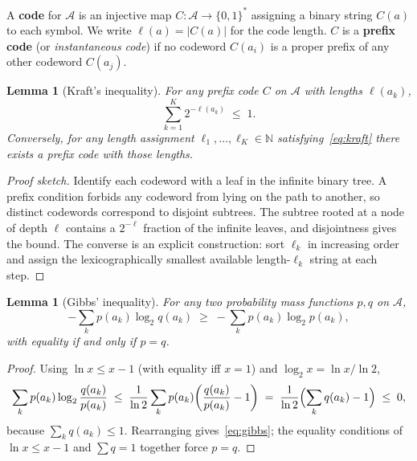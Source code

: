 \documentclass[12pt,a4paper]{article}
\theoremstyle{plain}
\newtheorem{lemma}[theorem]{Lemma}
\theoremstyle{definition}
\begin{document}
A \textbf{code} for $\mathcal{A}$ is an injective map
$C : \mathcal{A} \to \{0,1\}^*$ assigning a binary string $C(a)$ to
each symbol.  We write $\ell(a) = |C(a)|$ for the code length.  $C$ is
a \textbf{prefix code} (or \emph{instantaneous code}) if no codeword
$C(a_i)$ is a proper prefix of any other codeword $C(a_j)$.

\begin{lemma}[Kraft's inequality]
\label{lem:kraft}
For any prefix code $C$ on $\mathcal{A}$ with lengths $\ell(a_k)$,
\begin{equation}
  \sum_{k=1}^{K} 2^{-\ell(a_k)} \;\le\; 1.
  \label{eq:kraft}
\end{equation}
Conversely, for any length assignment $\ell_1, \dots, \ell_K \in
\mathbb{N}$ satisfying~\eqref{eq:kraft} there exists a prefix code
with those lengths.
\end{lemma}

\begin{proof}[Proof sketch]
Identify each codeword with a leaf in the infinite binary tree.  A
prefix condition forbids any codeword from lying on the path to
another, so distinct codewords correspond to disjoint subtrees.  The
subtree rooted at a node of depth $\ell$ contains a $2^{-\ell}$
fraction of the infinite leaves, and disjointness gives the bound.
The converse is an explicit construction: sort $\ell_k$ in increasing
order and assign the lexicographically smallest available
length-$\ell_k$ string at each step.
\end{proof}

\begin{lemma}[Gibbs' inequality]
\label{lem:gibbs}
For any two probability mass functions $p, q$ on $\mathcal{A}$,
\begin{equation}
  -\sum_{k} p(a_k) \log_2 q(a_k)
    \;\ge\; -\sum_{k} p(a_k) \log_2 p(a_k),
  \label{eq:gibbs}
\end{equation}
with equality if and only if $p = q$.
\end{lemma}

\begin{proof}
Using $\ln x \le x - 1$ (with equality iff $x = 1$) and
$\log_2 x = \ln x / \ln 2$,
\[
  \sum_k p(a_k) \log_2 \frac{q(a_k)}{p(a_k)}
  \;\le\; \frac{1}{\ln 2}\sum_k p(a_k)\!\left(\frac{q(a_k)}{p(a_k)} - 1\right)
  \;=\; \frac{1}{\ln 2}\Bigl(\sum_k q(a_k) - 1\Bigr) \;\le\; 0,
\]
because $\sum_k q(a_k) \le 1$.  Rearranging gives~\eqref{eq:gibbs};
the equality conditions of $\ln x \le x - 1$ and $\sum q = 1$ together
force $p = q$.
\end{proof}
\end{document}
